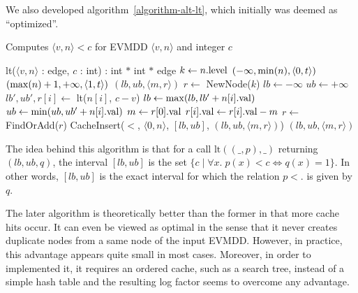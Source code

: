 \documentclass[a4paper,oneside,11pt,pdftex]{llncs}
\newcommand{\BLANK}{\STATE \vspace{-0.6em}}
\newcommand{\edge}[2]{\langle #1, #2 \rangle}
\newcommand{\val}[1]{#1{\rm .val}}
\newcommand{\level}[1]{#1{\rm .level}}
\begin{document}
We also developed algorithm~\vref{algorithm-alt-lt}, which initially was deemed as ``optimized''.
\begin{algorithm}[htbp]
  \caption{Computes $\edge{v}{n} < c$ for EVMDD $\edge{v}{n}$ and integer $c$}
  \label{algorithm-alt-lt}
  \begin{algorithmic}
    \item[lt($\edge{v}{n}$ : edge, $c$ : int) : int $*$ int $*$ edge]
    \STATE $k \gets \level{n}$
    \BLANK
    \STATE {}
      \RETURN $(-\infty, {\rm min}(n), \edge{0}{t})$ 
    \ENDIF
      \RETURN $({\rm max}(n)+1, +\infty, \edge{1}{t})$ 
    \ENDIF
    \BLANK
    \STATE {}
    \IF{CacheFind($<$, $\edge{0}{n}$, $c-v$, $(lb, ub, \edge{m}{r})$)}
      \RETURN $(lb, ub, \edge{m}{r})$
    \ENDIF
    \BLANK
    \STATE $r \gets$ NewNode($k$)
    \STATE $lb \gets -\infty$
    \STATE $ub \gets +\infty$
      \STATE $lb', ub', r[i] \gets$ lt($n[i]$, $c-v$)
      \STATE $lb \gets {\rm max}(lb, lb'+\val{n[i]})$
      \STATE $ub \gets {\rm min}(ub, ub'+\val{n[i]})$
    \ENDFOR
    \STATE $m \gets \val{r[0]}$
      \STATE $\val{r[i]} \gets \val{r[i]}-m$
    \ENDFOR
    \BLANK
    \STATE {}
    \STATE $r \gets$ FindOrAdd($r$)
    \BLANK
    \STATE {}
    \STATE CacheInsert($<$, $\edge{0}{n}$, $[lb, ub]$, $(lb, ub, \edge{m}{r})$)
    \BLANK
    \RETURN $(lb, ub, \edge{m}{r})$
  \end{algorithmic}
\end{algorithm}
The idea behind this algorithm is that
for a call $\mathrm{lt}((\_, p), \_)$ returning $(lb, ub, q)$, the 
interval $[lb, ub]$ is the set $\{c \;|\; \forall x.\; 
p\left(x\right) < c \Leftrightarrow 
q\left(x\right) = 1\}$. In other words, $[lb, ub]$
is the exact interval for which the relation $p < .$ is given by $q$.

The later algorithm is theoretically better than the former in that
more cache hits occur. It can even be viewed as optimal in the sense that
it never creates duplicate nodes from a same node of the input EVMDD.
However, in practice, this advantage appears quite small in most cases.
Moreover, in order to implemented it, it requires an ordered cache, such as a search tree,
instead of a simple hash table and the resulting log factor seems to overcome
any advantage.
\end{document}
